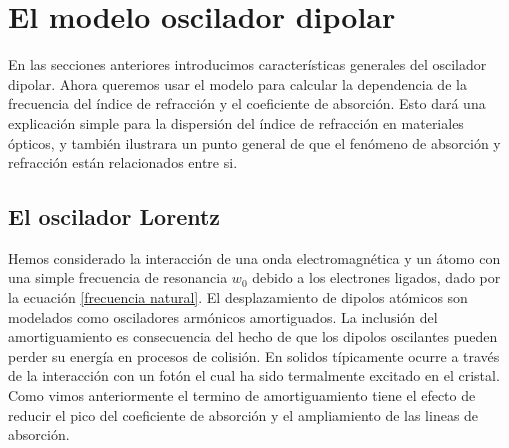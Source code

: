 \documentclass[a4paper,openright,12pt]{book}
\begin{document}
\section{El modelo oscilador dipolar}
En las secciones anteriores introducimos características generales del oscilador dipolar. Ahora queremos usar el modelo para calcular la dependencia de la frecuencia del índice de refracción y el coeficiente de absorción. Esto dará una explicación simple para la dispersión del índice de refracción en materiales ópticos, y también ilustrara un punto general de que el fenómeno de absorción y refracción están relacionados entre si.
\subsection{El oscilador Lorentz}
Hemos considerado la interacción de una onda electromagnética y un átomo con una simple frecuencia de resonancia $w_{0}$ debido a los electrones ligados, dado por la ecuación \ref{frecuencia natural}. El desplazamiento de dipolos atómicos son modelados como osciladores armónicos amortiguados. La inclusión del amortiguamiento es consecuencia del hecho de que los dipolos oscilantes pueden perder su energía en procesos de colisión. En solidos típicamente ocurre a través de la interacción con un fotón el cual ha sido termalmente excitado en el cristal. Como vimos anteriormente el termino de amortiguamiento tiene el efecto de reducir el pico del coeficiente de absorción y el ampliamiento de las lineas de absorción.
\end{document}
